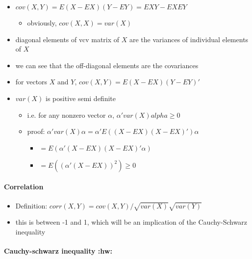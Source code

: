 \begin{itemize}
\item $cov(X,Y) = E(X - E X) (Y - EY) = E XY - EX EY$
\begin{itemize}
\item obviously, $cov(X,X) = var(X)$
\end{itemize}
\item diagonal elements of vcv matrix of $X$ are the variances of individual elements of $X$
\item we can see that the off-diagonal elements are the covariances
\item for vectors $X$ and $Y$, $cov(X,Y) = E(X - EX)(Y - EY)'$
\item $var(X)$ is positive semi definite
\begin{itemize}
\item i.e. for any nonzero vector $\alpha$, $\alpha' var(X)
            alpha \geq 0$
\item proof: $\alpha'var(X) \alpha = \alpha' E((X - EX)(X -
            EX)') \alpha$
\begin{itemize}
\item $= E(\alpha'(X - EX)(X - EX)' \alpha)$
\item $= E((\alpha'(X-EX))^2) \geq 0$
\end{itemize}
\end{itemize}
\end{itemize}
\paragraph{Correlation}
\label{sec-3-2-3}

\begin{itemize}
\item Definition: $corr(X, Y) = cov(X,Y) / \sqrt{var(X)} \sqrt{var(Y)}$
\item this is between -1 and 1, which will be an implication of the Cauchy-Schwarz inequality
\end{itemize}
\paragraph{Cauchy-schwarz inequality \textbf{:hw:}}
\label{sec-3-2-4}

